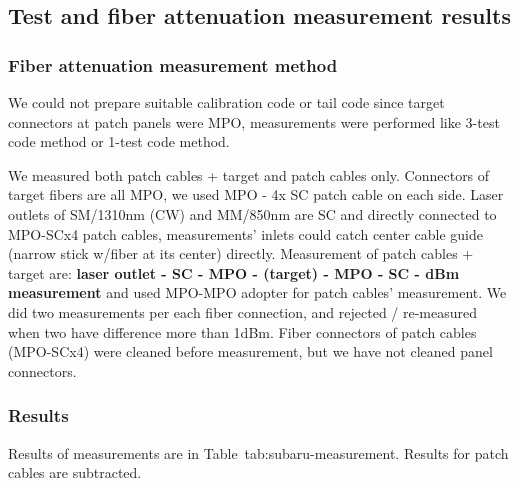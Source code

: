 \documentclass[a4paper,notitlepage]{article}
\begin{document}
\subsection{Test and fiber attenuation measurement results} 

\subsubsection{Fiber attenuation measurement method}

We could not prepare suitable calibration code or tail code since 
target connectors at patch panels were MPO, measurements were performed 
like 3-test code method or 1-test code method. 

We measured both patch cables + target and patch cables only. 
Connectors of target fibers are all MPO, we used MPO - 4x SC patch cable on 
each side. Laser outlets of SM/1310nm (CW) and MM/850nm are SC and directly 
connected to MPO-SCx4 patch cables, 
measurements' inlets could catch center cable guide (narrow stick w/fiber 
at its center) directly.
Measurement of patch cables + target are:
{\bf laser outlet - SC - MPO - (target) - MPO - SC - dBm measurement} 
and used MPO-MPO adopter for patch cables' measurement.
We did two measurements per each fiber connection, and rejected / re-measured 
when two have difference more than 1dBm. 
Fiber connectors of patch cables (MPO-SCx4) were cleaned before measurement, 
but we have not cleaned panel connectors. 

\subsubsection{Results}

Results of measurements are in Table~{tab:subaru-measurement}. 
Results for patch cables are subtracted. 
\end{document}
